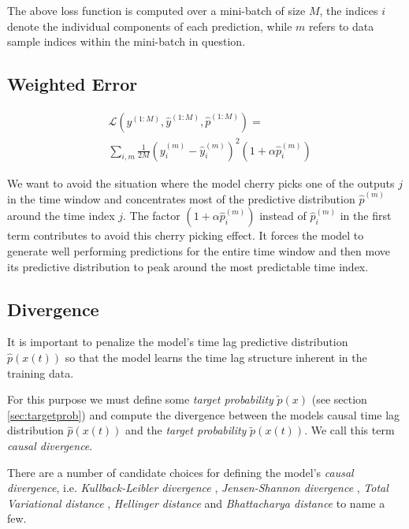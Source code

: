 \documentclass[envcountsect,runningheads]{llncs}
\theoremstyle{etoile}
\begin{document}
The above loss function is computed over a mini-batch of size $M$, the indices $i$ denote the
individual components of each prediction, while $m$ refers to data sample indices within the
mini-batch in question.

\subsection{Weighted Error}


\begin{align}\label{eq:errorfunc}
&\mathcal{L}(y^{(1:M)}, \hat{y}^{(1:M)}, \hat{p}^{(1:M)}) =\\ 
& \sum_{i,m}{\frac{1}{2M} (y^{(m)}_{i} - \hat{y}^{(m)}_{i})^2 (1 + \alpha \hat{p}^{(m)}_i)}
\end{align}

We want to avoid the situation where the model cherry picks one of the outputs 
$j$ in the time window and concentrates most of the predictive 
distribution $\hat p^{(m)}$ around the time index $j$. The factor 
$(1 + \alpha \hat p_i^{(m)})$ instead of $\hat p_i^{(m)}$ in the first term 
contributes to avoid this cherry picking effect. It forces the model to 
generate well performing predictions for the entire time window and then 
move its predictive distribution to peak around the most predictable time index.

\subsection{Divergence}

It is important to penalize the model's time lag predictive distribution 
$\hat{p}(x(t))$ so that the model learns the time lag structure inherent in the 
training data.

For this purpose we must define some \emph{target probability} $\tilde{p}(x)$ 
(see section \ref{sec:targetprob}) and compute the divergence between the models causal 
time lag distribution $\hat{p}(x(t))$ and the \emph{target probability} $\tilde{p}(x(t))$. 
We call this term \emph{causal divergence}.

There are a number of candidate choices for defining the model's \emph{causal divergence}, 
i.e.  \emph{Kullback-Leibler divergence} \cite{kullback1951}, 
\emph{Jensen-Shannon divergence} \cite{jensen-shannon}, \emph{Total Variational distance} 
\cite{villani2009three}, \emph{Hellinger distance} \cite{hellinger} and 
\emph{Bhattacharya distance} \cite{bhattacharyya} to name a few. 
\end{document}
